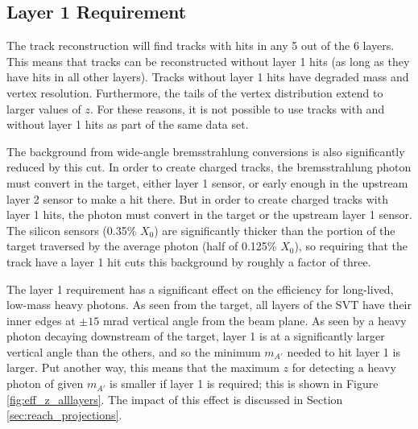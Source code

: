 \subsection{Layer 1 Requirement}
\label{sec:layer1_cut}
The track reconstruction will find tracks with hits in any 5 out of the 6 layers.
This means that tracks can be reconstructed without layer 1 hits (as long as they have hits in all other layers).
Tracks without layer 1 hits have degraded mass and vertex resolution.
Furthermore, the tails of the vertex distribution extend to larger values of $z$.
For these reasons, it is not possible to use tracks with and without layer 1 hits as part of the same data set.

The background from wide-angle bremsstrahlung conversions is also significantly reduced by this cut.
In order to create charged tracks, the bremsstrahlung photon must convert in the target, either layer 1 sensor, or early enough in the upstream layer 2 sensor to make a hit there.
But in order to create charged tracks with layer 1 hits, the photon must convert in the target or the upstream layer 1 sensor.
The silicon sensors (0.35\% $X_0$) are significantly thicker than the portion of the target traversed by the average photon (half of 0.125\% $X_0$), so requiring that the track have a layer 1 hit cuts this background by roughly a factor of three.

The layer 1 requirement has a significant effect on the efficiency for long-lived, low-mass heavy photons.
As seen from the target, all layers of the SVT have their inner edges at $\pm 15$ mrad vertical angle from the beam plane.
As seen by a heavy photon decaying downstream of the target, layer 1 is at a significantly larger vertical angle than the others, and so the minimum $m_{A'}$ needed to hit layer 1 is larger.
Put another way, this means that the maximum $z$ for detecting a heavy photon of given $m_{A'}$ is smaller if layer 1 is required; this is shown in Figure \ref{fig:eff_z_alllayers}.
The impact of this effect is discussed in Section \ref{sec:reach_projections}.

